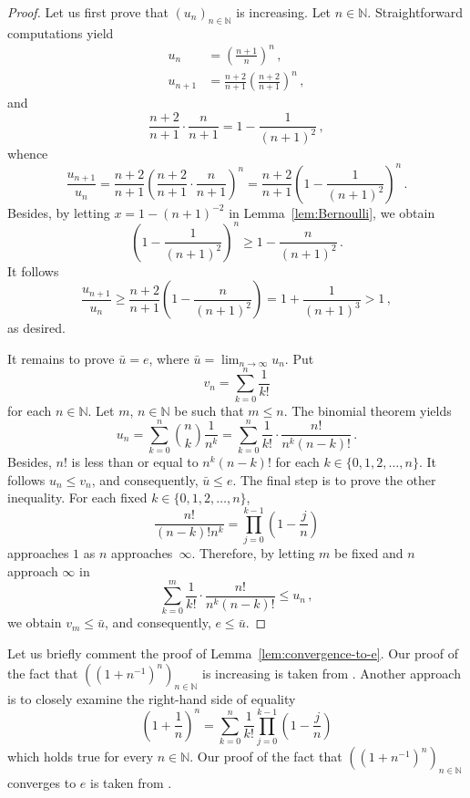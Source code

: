\documentclass[12pt]{article}
\newcommand{\bN}{\mathbb{N}} %
\begin{document}
\begin{proof}
  Let us first prove that $\left( u_n \right)_{n \in \bN}$ is increasing.
  Let $n \in \bN$.
  Straightforward computations yield
  \begin{align*}
    u_n & = \left( \frac{n + 1}{n}  \right)^n \,, \\
          u_{n + 1} & = \frac{n + 2}{n + 1} \left( \frac{n + 2}{n + 1} \right)^n \,,
  \end{align*}
  and 
  $$
  \frac{n + 2}{n + 1} \cdot \frac{n}{n + 1} = 1 - \frac{1}{{(n + 1)}^2}  \,,
   $$
  whence 
  $$
  \frac{u_{n + 1}}{u_n}
  = \frac{n + 2}{n + 1} \left( \frac{n + 2}{n + 1} \cdot \frac{n}{n + 1} \right)^n
  = \frac{n + 2}{n + 1} \left( 1 - \frac{1}{{(n + 1)}^2} \right)^n \, .
  $$
  Besides, by letting $x = 1 - {(n + 1)}^{-2}$ in Lemma~\ref{lem:Bernoulli}, we obtain 
   $$
   \left( 1 - \frac{1}{{(n + 1)}^2}  \right)^n \ge  1 - \frac{n}{{(n + 1)}^2} \, . 
 $$
 It follows
 $$
 \frac{u_{n + 1}} {u_n}
 \ge \frac{n + 2}{n + 1}  \left( 1 - \frac{n}{{(n + 1)}^2} \right)
 =
 1 + \frac{1}{{(n + 1)}^3}
 > 1 \,, 
 $$
 as desired.
  
  It remains to prove $\bar u = e$, where $\bar u = \lim_{n \to \infty} u_n$.
  Put
  $$
  v_n = \sum_{k = 0}^n \frac{1}{k!} 
  $$
  for each $n \in \bN$.
  Let $m$, $n \in \bN$ be such that $m \le n$.
  The binomial theorem yields
  $$
  u_n
  = \sum_{k = 0}^n  \binom{n}{k} \frac{1}{n^k}
  = \sum_{k = 0}^n \frac{1}{k!} \cdot \frac{n!}{n^k {(n - k)}!} \, .
  $$
  Besides, $n!$ is less than or equal to $n^k {(n - k)}!$ for each $k \in \{ 0, 1, 2, \dotsc, n \}$.
  It follows $ u_n \le v_n$,  and consequently, $\bar u \le e$.
  The final step is to prove the other inequality.
 For each fixed $k \in \{ 0, 1, 2, \dotsc, n \}$, 
  $$
  \frac{n!}{{(n - k)}! n^k} = \prod_{j = 0}^{k - 1} \left( 1 - \frac{j}{n} \right) 
 $$
 approaches $1$ as $n$ approaches~$\infty$.
 Therefore, by letting $m$ be fixed and $n$ approach $\infty$ in 
 $$
  \sum_{k = 0}^m \frac{1}{k!} \cdot \frac{n!}{n^k {(n - k)}!} \le u_n \,, 
  $$
  we obtain $v_m \le \bar u$, and consequently, $e \le \bar u$.
\end{proof}


Let us briefly comment the proof of Lemma~\ref{lem:convergence-to-e}.
Our proof of the fact that $\left( \left( 1 + n^{-1} \right)^n  \right)_{n \in \bN}$
is increasing is taken from \cite{Wiener85}.
Another approach \cite{GiaquintaModicaApprox} is to closely examine the right-hand side of equality 
$$ 
\left(1 + \frac{1}{n} \right)^n = \sum_{k = 0}^n \frac{1}{k!} \prod_{j = 0}^{k - 1} \left(1 - \frac{j}{n} \right) 
$$
which holds true for every $n \in \bN$.
Our proof of the fact that
$\left( \left( 1 + n^{-1} \right)^n  \right)_{n \in \bN}$ converges to $e$ is taken from \cite{RudinPrinciples}.
\end{document}
